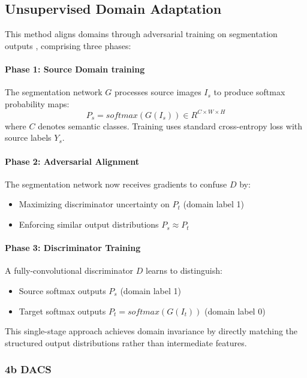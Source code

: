\documentclass{article}
\begin{document}
\begin{multicols}{2}
\subsection{Unsupervised Domain Adaptation}  
 
This method aligns domains through adversarial training on segmentation outputs \cite{tsai2018learning}, comprising three phases:  

\paragraph{Phase 1: Source Domain training}  
The segmentation network $G$ processes source images $I_s$ to produce softmax probability maps:  
\begin{equation}  
	P_s = {softmax}(G(I_s)) \in {R}^{C \times W \times H}  
\end{equation}  
where $C$ denotes semantic classes. Training uses standard cross-entropy loss with source labels $Y_s$.  



\paragraph{Phase 2: Adversarial Alignment}  
The segmentation network now receives gradients to confuse $D$ by:  
\begin{itemize}  
	\item Maximizing discriminator uncertainty on $P_t$ (domain label 1)
	\item Enforcing similar output distributions $P_s \approx P_t$  

\end{itemize}  

\paragraph{Phase 3: Discriminator Training}  
A fully-convolutional discriminator $D$ learns to distinguish:  
\begin{itemize}  
	\item Source softmax outputs $P_s$ (domain label 1)  
	\item Target softmax outputs $P_t = {softmax}(G(I_t))$ (domain label 0)  
\end{itemize}  


This single-stage approach achieves domain invariance by directly matching the structured output distributions rather than intermediate features.  

	\subsubsection{4b DACS}
	

\end{multicols}
\end{document}
